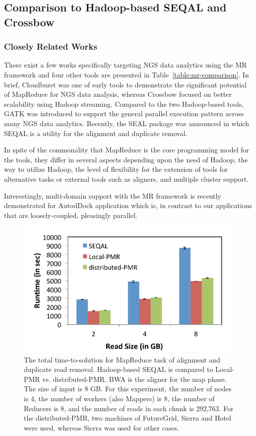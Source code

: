 \documentclass{sig-alternate}
\begin{document}
\subsection{Comparison to Hadoop-based SEQAL and Crossbow}
\subsubsection{Closely Related Works}
There exist a few works specifically targeting NGS data analytics using the MR framework and four other tools are presented in Table~\ref{table:mr-comparison}.  In brief, Cloudburst was one of early tools to demonstrate the significant potential of MapReduce for NGS data analysis, whereas Crossbow focused on better scalability using Hadoop streaming.  Compared to the two Hadoop-based tools, GATK was introduced to support the general parallel execution pattern across many NGS data analytics.  Recently, the SEAL package was announced in which SEQAL is a utility for the alignment and duplicate removal.   

In spite of the commonality that MapReduce is the core programming model for the tools, they differ in several aspects depending upon the need of Hadoop, the way to utilize Hadoop, the level of flexibility for the extension of tools for alternative tasks or external tools such as aligners, and multiple cluster support.

Interestingly, multi-domain support with the MR framework is recently demonstrated for AutodDock application which is, in contrast to our applications that are loosely-coupled, pleasingly parallel.\cite{ecmls11-mr-autodock}

\begin{figure}
 \centering
\includegraphics[scale=0.50]{figures/seqalvslocalpmr.pdf}

\caption{\small The total time-to-solution for MapReduce task of alignment and duplicate read removal.  Hadoop-based SEQAL is compared to Local-PMR vs. distributed-PMR.  BWA is the aligner for the map phase.  The size of input is 8 GB.  For this experiment, the number of nodes is 4, the number of workers (also Mappers) is 8, the number of Reducers is 8, and the number of reads in each chunk is 292,763. For the distributed-PMR, two machines of FutureGrid, Sierra and Hotel were used, whereas Sierra was used for other cases.}

  \label{fig:comp_with_seqal_1} 
\end{figure}
\end{document}
